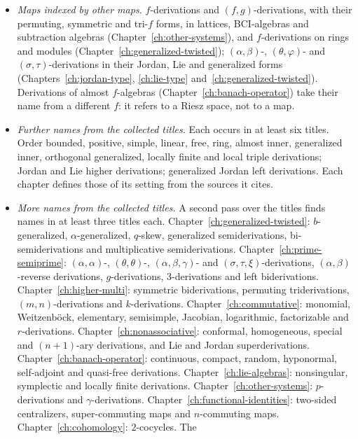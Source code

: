 \begin{itemize}
(Chapter~\ref{ch:polynomial-weyl}): right derivations. Partial derivations of
functions of $n$ variables. Each chapter defines its kinds from the sources it cites.
\item \emph{Maps indexed by other maps.} $f$-derivations and
$(f,g)$-derivations, with their permuting, symmetric and tri-$f$ forms, in
lattices, BCI-algebras and subtraction algebras (Chapter~\ref{ch:other-systems}),
and $f$-derivations on rings and modules (Chapter~\ref{ch:generalized-twisted});
$(\alpha,\beta)$-, $(\theta,\varphi)$- and $(\sigma,\tau)$-derivations in their
Jordan, Lie and generalized forms (Chapters~\ref{ch:jordan-type},
\ref{ch:lie-type} and~\ref{ch:generalized-twisted}). Derivations of almost
$f$-algebras (Chapter~\ref{ch:banach-operator}) take their name from a different
$f$: it refers to a Riesz space, not to a map.
\item \emph{Further names from the collected titles.} Each occurs in at least six
titles. Order bounded, positive, simple, linear, free, ring, almost inner,
generalized inner, orthogonal generalized, locally finite and local triple
derivations; Jordan and Lie higher derivations; generalized Jordan left
derivations. Each chapter defines those of its setting from the sources it cites.
\item \emph{More names from the collected titles.} A second pass over the
titles finds names in at least three titles each. Chapter~\ref{ch:generalized-twisted}:
$b$-generalized, $\alpha$-generalized, $q$-skew, generalized semiderivations,
bi-semiderivations and multiplicative semiderivations.
Chapter~\ref{ch:prime-semiprime}: $(\alpha,\alpha)$-, $(\theta,\theta)$-,
$(\alpha,\beta,\gamma)$- and $(\sigma,\tau,\xi)$-derivations,
$(\alpha,\beta)$-reverse derivations, $g$-derivations, $3$-derivations and left
biderivations. Chapter~\ref{ch:higher-multi}: symmetric biderivations,
permuting triderivations, $(m,n)$-derivations and $k$-derivations.
Chapter~\ref{ch:commutative}: monomial, Weitzenb\"ock, elementary, semisimple,
Jacobian, logarithmic, factorizable and $r$-derivations.
Chapter~\ref{ch:nonassociative}: conformal, homogeneous, special and
$(n+1)$-ary derivations, and Lie and Jordan superderivations.
Chapter~\ref{ch:banach-operator}: continuous, compact, random, hyponormal,
self-adjoint and quasi-free derivations. Chapter~\ref{ch:lie-algebras}:
nonsingular, symplectic and locally finite derivations.
Chapter~\ref{ch:other-systems}: $p$-derivations and $\gamma$-derivations.
Chapter~\ref{ch:functional-identities}: two-sided centralizers, super-commuting
maps and $n$-commuting maps. Chapter~\ref{ch:cohomology}: $2$-cocycles. The

\end{itemize}
